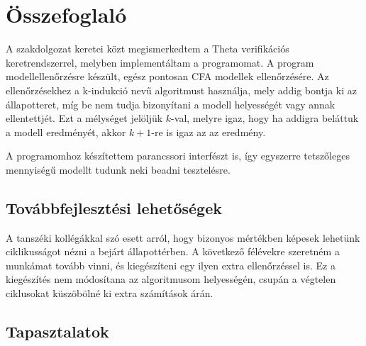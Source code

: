 \chapter{Összefoglaló}

A szakdolgozat keretei közt megismerkedtem a Theta verifikációs keretrendszerrel, melyben implementáltam a programomat. A program modellellenőrzésre készült, egész pontosan CFA modellek ellenőrzésére. Az ellenőrzésekhez a k-indukció nevű algoritmust használja, mely addig bontja ki az állapotteret, míg be nem tudja bizonyítani a modell helyességét vagy annak ellentettjét. Ezt a mélységet jelöljük $ k $-val, melyre igaz, hogy ha addigra beláttuk a modell eredményét, akkor $ k+1 $-re is igaz az az eredmény.

A programomhoz készítettem parancssori interfészt is, így egyszerre tetszőleges mennyiségű modellt tudunk neki beadni tesztelésre. 

\section{Továbbfejlesztési lehetőségek}

A tanszéki kollégákkal szó esett arról, hogy bizonyos mértékben képesek lehetünk ciklikusságot nézni a bejárt állapottérben. A következő félévekre szeretném a munkámat tovább vinni, és kiegészíteni egy ilyen extra ellenőrzéssel is. Ez a kiegészítés nem módosítana az algoritmusom helyességén, csupán a végtelen ciklusokat küszöbölné ki extra számítások árán.

\section{Tapasztalatok}

